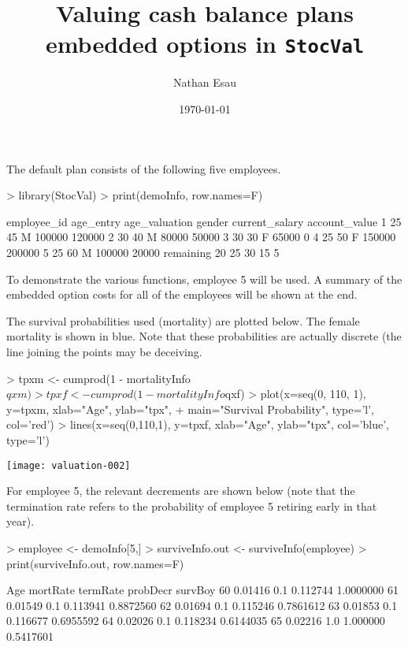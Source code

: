 \documentclass[12pt]{article}
\title{Valuing cash balance plans embedded options in \texttt{StocVal}}
\author{Nathan Esau}
\date{\today}
\begin{document}


\maketitle

The default plan consists of the following five employees.

\begin{Schunk}
\begin{Sinput}
> library(StocVal)
> print(demoInfo, row.names=F)
\end{Sinput}
\begin{Soutput}
 employee_id age_entry age_valuation gender current_salary account_value
           1        25            45      M         100000        120000
           2        30            40      M          80000         50000
           3        30            30      F          65000             0
           4        25            50      F         150000        200000
           5        25            60      M         100000         20000
 remaining
        20
        25
        30
        15
         5
\end{Soutput}
\end{Schunk}

To demonstrate the various functions, employee 5 will be used. A summary
of the embedded option costs for all of the employees will be shown at the end.

\medskip
The survival probabilities used (mortality) are plotted below. The female 
mortality is shown in blue. Note that these probabilities are actually discrete (the
line joining the points may be deceiving.

\begin{Schunk}
\begin{Sinput}
> tpxm <- cumprod(1 - mortalityInfo$qxm)
> tpxf <- cumprod(1 - mortalityInfo$qxf)
> plot(x=seq(0, 110, 1), y=tpxm, xlab="Age", ylab="tpx", 
+   main="Survival Probability", type='l', col='red')
> lines(x=seq(0,110,1), y=tpxf, xlab="Age", ylab="tpx", col='blue', type='l')
\end{Sinput}
\end{Schunk}
\texttt{[image: valuation-002]}

For employee 5, the relevant decrements are shown below (note that 
the termination rate refers to the probability of employee 5 retiring early
in that year).
\begin{Schunk}
\begin{Sinput}
> employee <- demoInfo[5,]
> surviveInfo.out <- surviveInfo(employee)
> print(surviveInfo.out, row.names=F)
\end{Sinput}
\begin{Soutput}
 Age mortRate termRate probDecr   survBoy
  60  0.01416      0.1 0.112744 1.0000000
  61  0.01549      0.1 0.113941 0.8872560
  62  0.01694      0.1 0.115246 0.7861612
  63  0.01853      0.1 0.116677 0.6955592
  64  0.02026      0.1 0.118234 0.6144035
  65  0.02216      1.0 1.000000 0.5417601
\end{Soutput}
\end{Schunk}
\end{document}
